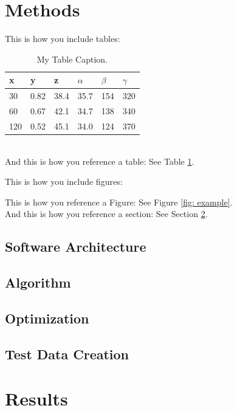 \documentclass{article}
\begin{document}
\section{Methods}
This is how you include tables:
\begin{table}[htb]
\begin{center}
\caption{My Table Caption.}
\label{tab: example} %
\begin{tabular}{|l|l|l|l|l|l|}
\hline
x & y & z & $\alpha$
& $\beta$
& $\gamma$\\\hline
30 & 0.82 & 38.4 & 35.7 & 154 & 320 \\
60 & 0.67 & 42.1 & 34.7 & 138 & 340 \\
120 & 0.52 & 45.1 & 34.0 & 124 & 370 \\
\hline
\end{tabular}
\end{center}
\end{table}\\
And this is how you reference a table: See Table \ref{tab: example}.\\
\newpage

This is how you include figures:

This is how you reference a Figure: See Figure \ref{fig: example}. \\
And this is how you reference a section: See Section \ref{sec: Results}.
\subsection{Software Architecture}
\subsection{Algorithm}
\subsection{Optimization}
\subsection{Test Data Creation}
\section{Results}\label{sec: Results}
\end{document}
